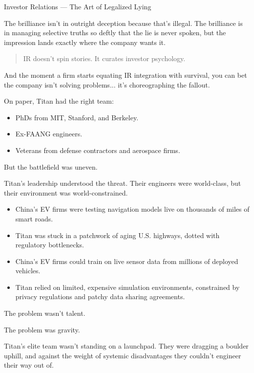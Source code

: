 \begin{HistoricalSidebar}{Investor Relations --- The Art of Legalized Lying}
    \medskip
    
    The brilliance isn’t in outright deception because that’s illegal.  
    The brilliance is in managing selective truths so deftly that the lie is never spoken,  
    but the impression lands exactly where the company wants it.
    
    \begin{quote}
    IR doesn’t spin stories.  
    It curates investor psychology.
    \end{quote}
    
    \medskip
    
    And the moment a firm starts equating IR integration with survival,  
    you can bet the company isn’t solving problems...  it’s choreographing the fallout.
    
\end{HistoricalSidebar}

\medskip

On paper, Titan had the right team:

\begin{itemize}
    \item PhDs from MIT, Stanford, and Berkeley.
    \item Ex-FAANG engineers.
    \item Veterans from defense contractors and aerospace firms.
\end{itemize}

But the battlefield was uneven.

Titan’s leadership understood the threat.  Their engineers were world-class, but their environment was world-constrained.

\begin{itemize}
    \item China’s EV firms were testing navigation models live on thousands of miles of smart roads.
    \item Titan was stuck in a patchwork of aging U.S. highways, dotted with regulatory bottlenecks.
    \item China's EV firms could train on live sensor data from millions of deployed vehicles.
    \item Titan relied on limited, expensive simulation environments, constrained by privacy regulations and patchy data sharing agreements.
\end{itemize}

The problem wasn’t talent.

The problem was gravity.

Titan’s elite team wasn’t standing on a launchpad.
They were dragging a boulder uphill, and 
against the weight of systemic disadvantages
they couldn’t engineer their way out of.

